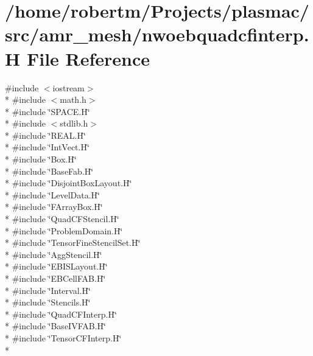 \hypertarget{nwoebquadcfinterp_8H}{}\section{/home/robertm/\+Projects/plasmac/src/amr\+\_\+mesh/nwoebquadcfinterp.H File Reference}
\label{nwoebquadcfinterp_8H}
{\ttfamily \#include $<$iostream$>$}\\*
{\ttfamily \#include $<$math.\+h$>$}\\*
{\ttfamily \#include \char`\"{}S\+P\+A\+C\+E.\+H\char`\"{}}\\*
{\ttfamily \#include $<$stdlib.\+h$>$}\\*
{\ttfamily \#include \char`\"{}R\+E\+A\+L.\+H\char`\"{}}\\*
{\ttfamily \#include \char`\"{}Int\+Vect.\+H\char`\"{}}\\*
{\ttfamily \#include \char`\"{}Box.\+H\char`\"{}}\\*
{\ttfamily \#include \char`\"{}Base\+Fab.\+H\char`\"{}}\\*
{\ttfamily \#include \char`\"{}Disjoint\+Box\+Layout.\+H\char`\"{}}\\*
{\ttfamily \#include \char`\"{}Level\+Data.\+H\char`\"{}}\\*
{\ttfamily \#include \char`\"{}F\+Array\+Box.\+H\char`\"{}}\\*
{\ttfamily \#include \char`\"{}Quad\+C\+F\+Stencil.\+H\char`\"{}}\\*
{\ttfamily \#include \char`\"{}Problem\+Domain.\+H\char`\"{}}\\*
{\ttfamily \#include \char`\"{}Tensor\+Fine\+Stencil\+Set.\+H\char`\"{}}\\*
{\ttfamily \#include \char`\"{}Agg\+Stencil.\+H\char`\"{}}\\*
{\ttfamily \#include \char`\"{}E\+B\+I\+S\+Layout.\+H\char`\"{}}\\*
{\ttfamily \#include \char`\"{}E\+B\+Cell\+F\+A\+B.\+H\char`\"{}}\\*
{\ttfamily \#include \char`\"{}Interval.\+H\char`\"{}}\\*
{\ttfamily \#include \char`\"{}Stencils.\+H\char`\"{}}\\*
{\ttfamily \#include \char`\"{}Quad\+C\+F\+Interp.\+H\char`\"{}}\\*
{\ttfamily \#include \char`\"{}Base\+I\+V\+F\+A\+B.\+H\char`\"{}}\\*
{\ttfamily \#include \char`\"{}Tensor\+C\+F\+Interp.\+H\char`\"{}}\\*
